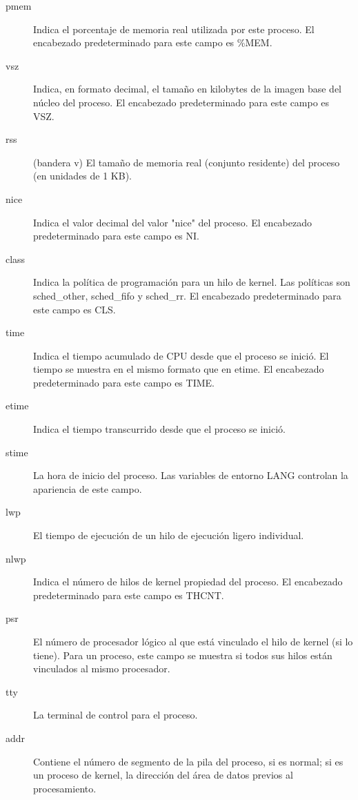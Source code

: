 \documentclass[11pt]{article}
\begin{document}
\begin{description}
\item[{pmem}] Indica el porcentaje de memoria real utilizada por este proceso. El encabezado predeterminado para este campo es \%MEM.

\item[{vsz}] Indica, en formato decimal, el tamaño en kilobytes de la imagen base del núcleo del proceso. El encabezado predeterminado para este campo es VSZ.

\item[{rss}] (bandera v) El tamaño de memoria real (conjunto residente) del proceso (en unidades de 1 KB).

\item[{nice}] Indica el valor decimal del valor "nice" del proceso. El encabezado predeterminado para este campo es NI.

\item[{class}] Indica la política de programación para un hilo de kernel. Las políticas son sched\_other, sched\_fifo y sched\_rr. El encabezado predeterminado para este campo es CLS.

\item[{time}] Indica el tiempo acumulado de CPU desde que el proceso se inició. El tiempo se muestra en el mismo formato que en etime. El encabezado predeterminado para este campo es TIME.

\item[{etime}] Indica el tiempo transcurrido desde que el proceso se inició.

\item[{stime}] La hora de inicio del proceso. Las variables de entorno LANG controlan la apariencia de este campo.

\item[{lwp}] El tiempo de ejecución de un hilo de ejecución ligero individual.

\item[{nlwp}] Indica el número de hilos de kernel propiedad del proceso. El encabezado predeterminado para este campo es THCNT.

\item[{psr}] El número de procesador lógico al que está vinculado el hilo de kernel (si lo tiene). Para un proceso, este campo se muestra si todos sus hilos están vinculados al mismo procesador.

\item[{tty}] La terminal de control para el proceso.

\item[{addr}] Contiene el número de segmento de la pila del proceso, si es normal; si es un proceso de kernel, la dirección del área de datos previos al procesamiento.


\end{description}
\end{document}
